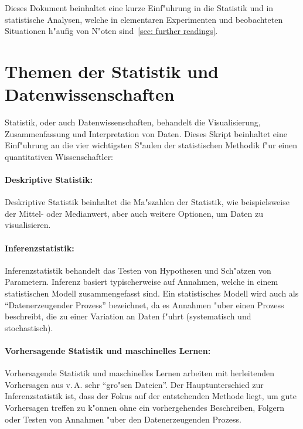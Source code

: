 \documentclass[a4paper,twoside]{tufte-book}\usepackage[]{graphicx}\usepackage[]{color}
\begin{document}
	Dieses Dokument beinhaltet eine kurze Einf"uhrung in die Statistik und in statistische Analysen, welche in elementaren Experimenten und beobachteten Situationen h"aufig von N"oten sind~\ref{sec: further readings}.
	
	\section{Themen der Statistik und Datenwissenschaften}
	Statistik, oder auch Datenwissenschaften, behandelt die Visualisierung, Zusammenfassung und Interpretation von Daten. Dieses Skript beinhaltet eine Einf"uhrung an die vier wichtigsten S"aulen der statistischen Methodik f"ur einen quantitativen Wissenschaftler:
	
	\paragraph{Deskriptive Statistik:} Deskriptive Statistik beinhaltet die Ma"szahlen der Statistik, wie beispielsweise der Mittel- oder Medianwert, aber auch weitere Optionen, um Daten zu visualisieren.
	
	\paragraph{Inferenzstatistik:} Inferenzstatistik behandelt das Testen von Hypothesen und Sch"atzen von Parametern. Inferenz basiert typischerweise auf Annahmen, welche in einem statistischen Modell zusammengefasst sind. Ein statistisches Modell wird auch als "`Datenerzeugender Prozess"' bezeichnet, da es Annahmen "uber einen Prozess beschreibt, die zu einer Variation an Daten f"uhrt (systematisch und stochastisch).
	
	\paragraph{Vorhersagende Statistik und maschinelles Lernen:} Vorhersagende Statistik und maschinelles Lernen arbeiten mit herleitenden Vorhersagen aus v.\,A. sehr "`gro"sen Dateien"'. Der Hauptunterschied zur Inferenzstatistik ist, dass der Fokus auf der entstehenden Methode liegt, um gute Vorhersagen treffen zu k"onnen ohne ein vorhergehendes Beschreiben, Folgern oder Testen von Annahmen "uber den Datenerzeugenden Prozess.
	
\end{document}
